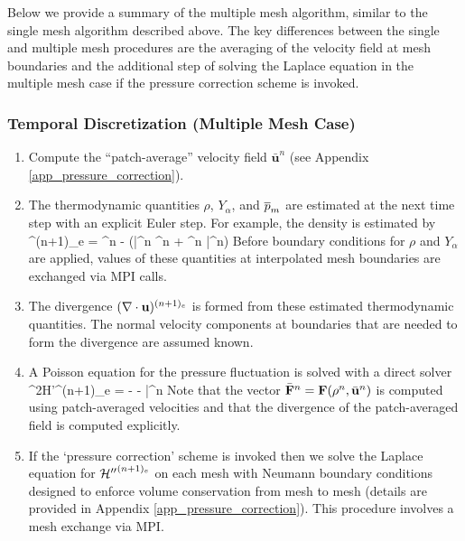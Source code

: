 \documentclass[11pt]{book}
\begin{document}
Below we provide a summary of the multiple mesh algorithm, similar to the single mesh algorithm described above.  The key differences between the single and multiple mesh procedures are the averaging of the velocity field at mesh boundaries and the additional step of solving the Laplace equation in the multiple mesh case if the pressure correction scheme is invoked.

\subsubsection{Temporal Discretization (Multiple Mesh Case)}

\begin{enumerate}
\item Compute the ``patch-average'' velocity field $\bar{\mathbf{u}}^n$ (see Appendix \ref{app_pressure_correction}).

\item The thermodynamic quantities $\rho$, $Y_\alpha$, and $\overline{p}_m$ are
estimated at the next time step with an explicit Euler step. For
example, the density is estimated by
\be \rho^{(n+1)_e} = \rho^n - \dt (\bar{}^n \cdot \nabla \rho^n + \rho^n \nabla \cdot \bar{}^n) \ee
Before boundary conditions for $\rho$ and $Y_\alpha$ are applied, values of these quantities at
interpolated mesh boundaries are exchanged via MPI calls.

\item The divergence $(\nabla \cdot {\bf u})^{(n+1)_e}$ is formed from these
estimated thermodynamic quantities. The normal velocity components at
boundaries that are needed to form the divergence are assumed known.

\item A Poisson equation for the pressure fluctuation is solved with a direct solver
\be \nabla^2{\cal H'}^{(n+1)_e} = -  - \nabla \cdot \bar{\bF}^n  \ee
Note that the vector $\bar{{\bf F}}^n = {\bf F}(\rho^n,\bar{\mathbf{u}}^n)$ is computed using patch-averaged velocities and that the divergence of the patch-averaged field is computed explicitly.

\item If the `pressure correction' scheme is invoked then we solve the Laplace equation for ${{\cal H}''}^{(n+1)_e}$ on each mesh with Neumann boundary conditions designed to enforce volume conservation from mesh to mesh (details are provided in Appendix \ref{app_pressure_correction}).  This procedure involves a mesh exchange via MPI.


\end{enumerate}
\end{document}
